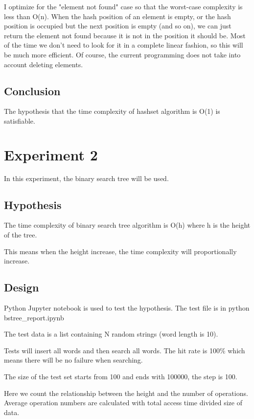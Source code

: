 \documentclass[a4]{article}
\begin{document}
\noindent I optimize for the "element not found" case so that the worst-case complexity is less than O(n). When the hash position of an element is empty, or the hash position is occupied but the next position is empty (and so on), we can just return the element not found because it is not in the position it should be. Most of the time we don't need to look for it in a complete linear fashion, so this will be much more efficient. Of course, the current programming does not take into account deleting elements.

\subsection{Conclusion}

The hypothesis that the time complexity of hashset algorithm is O(1) is satisfiable.

\section{Experiment 2}

In this experiment, the binary search tree will be used.

\subsection{Hypothesis}

The time complexity of binary search tree algorithm is O(h) where h is the height of the tree.

This means when the height increase, the time complexity will proportionally increase.

\subsection{Design}

Python Jupyter notebook is used to test the hypothesis. The test file is in python bstree\_report.ipynb

\noindent The test data is a list containing N random strings (word length is 10).

\noindent Tests will insert all words and then search all words. The hit rate is 100\% which means there will be no failure when searching.

\noindent The size of the test set starts from 100 and ends with 100000, the step is 100.

\noindent Here we count the relationship between the height and the number of operations. Average operation numbers are calculated with total access time divided size of data.
\end{document}
